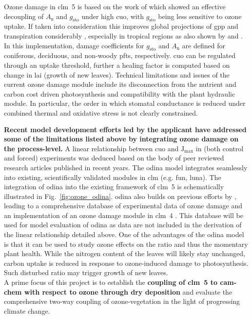 Ozone damage in \gls{clm}~5 is based on the work of \textcite{Oe:Lombardozzi2012} which showed an effective decoupling of $A_\mathrm{n}$ and $g_\mathrm{sto}$ under high \gls{cuo}, with $g_\mathrm{sto}$ being less sensitive to ozone uptake. If taken into consideration this improves global projections of \gls{gpp} and transpiration considerably \parencite{BGS:Lombardozzi2012}, especially in tropical regions as also shown by \textcite{Nat:Sitch2007} and \textcite{ACP:Pacifico2015}. In this implementation, damage coefficients for $g_\mathrm{sto}$ and $A_\mathrm{n}$ are defined for coniferous, deciduous, and non-woody \glspl{pft}, respectively. \gls{cuo} can be regulated through an uptake threshold, further a healing factor is computed based on change in \gls{lai} (growth of new leaves). Technical limitations and issues of the current ozone damage module include its disconnection from the nutrient and carbon cost driven photosynthesis and compatibility with the plant hydraulic module. In particular, the order in which stomatal conductance is reduced under combined thermal and oxidative stress is not clearly constrained.

\textbf{Recent model development efforts led by the applicant have addressed some of the limitations listed above by integrating ozone damage on the process-level.} A linear relationship between \gls{cuo} and $\mathrm{J_{max}}$ in (both control and forced) experiments was deduced based on the body of peer reviewed research articles published in recent years. The \gls{odina} model integrates seamlessly into existing, scientifically validated modules in \gls{clm} (e.g. \gls{fun}, \gls{luna}). The integration of \gls{odina} into the existing framework of \gls{clm}~5 is schematically illustrated in Fig.~\ref{fig:ozone_odina}. \gls{odina} also builds on previous efforts by \textcites{BGS:Lombardozzi2012}{Oe:Lombardozzi2012}, leading to a comprehensive database of experimental data of ozone damage and an implementation of an ozone damage module in \gls{clm}~4 \parencite{BGS:Lombardozzi2013}. This database will be used for model evaluation of \gls{odina} as data are not included in the derivation of the linear relationship detailed above. One of the advantages of the \gls{odina} model is that it can be used to study ozone effects on the  ratio  and thus the momentary plant health. While the nitrogen content of the leaves will likely stay unchanged, carbon uptake is reduced in response to ozone-induced damage to photosynthesis. Such disturbed  ratio may trigger growth of new leaves.\\

A prime focus of this project is to establish the \textbf{coupling of \gls{clm}~5 to \gls{cam}-chem with respect to ozone through dry deposition} and evaluate the comprehensive two-way coupling of ozone-vegetation in the light of progressing climate change.
